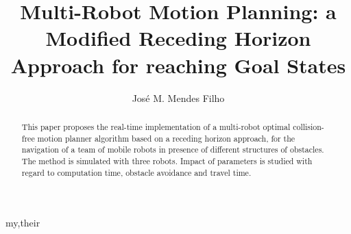 \documentclass[eprint]{actapoly}
\begin{document}
\title[Trajectory Generation Approach]
{Multi-Robot Motion Planning: a Modified Receding Horizon Approach for reaching Goal States}

\author[J. M. Mendes Filho]{Jos\'{e} M. Mendes Filho}{my,their}


\begin{abstract}


This paper proposes the real-time implementation of a multi-robot optimal collision-free motion planner algorithm based on a receding horizon approach, for the navigation of a team of mobile robots in presence of different structures of obstacles. The method is simulated with three robots. Impact of parameters is studied with regard to computation time, obstacle avoidance and travel time.

 
\end{abstract}


\maketitle
\end{document}
